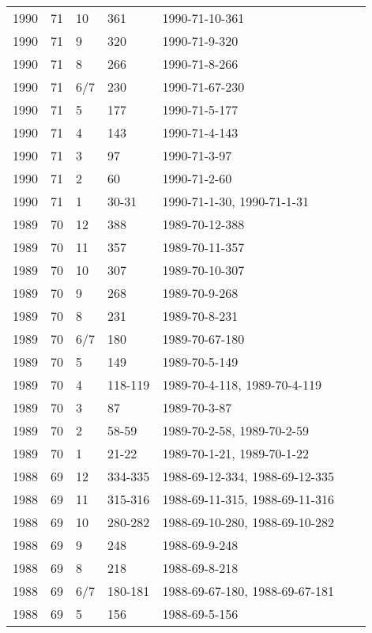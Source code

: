 \begin{longtable}{ |l|l|l|l|p{2.7cm}|l|p{2cm}| }
 1990 & 71 &    10 &    361  & 1990-71-10-361 &  & \\
 1990 & 71 &     9 &    320  & 1990-71-9-320  &  & \\
 1990 & 71 &     8 &    266  & 1990-71-8-266  &  & \\
 1990 & 71 &   6/7 &    230  & 1990-71-67-230 &  & \\
 1990 & 71 &     5 &    177  & 1990-71-5-177  &   & \\
 1990 & 71 &     4 &    143  & 1990-71-4-143  &  & \\
 1990 & 71 &     3 &   97    & 1990-71-3-97   &  & \\
 1990 & 71 &     2 &  60     & 1990-71-2-60   &  & \\
 1990 & 71 &     1 &  30-31  & 1990-71-1-30, 1990-71-1-31               &  & \\
 1989 & 70 &    12 &    388  & 1989-70-12-388 &   & \\
 1989 & 70 &    11 &    357  & 1989-70-11-357 &  & \\
 1989 & 70 &    10 &  307    & 1989-70-10-307 &  & \\
 1989 & 70 &     9 &    268  & 1989-70-9-268  &  & \\
 1989 & 70 &     8 &   231   &  1989-70-8-231 &  & \\
 1989 & 70 &   6/7 &   180   & 1989-70-67-180 &  & \\
 1989 & 70 &     5 & 149     & 1989-70-5-149  &  & \\
 1989 & 70 &     4 & 118-119 & 1989-70-4-118, 1989-70-4-119 &  & \\
 1989 & 70 &     3 &    87   & 1989-70-3-87   &  & \\
 1989 & 70 &     2 &  58-59  & 1989-70-2-58, 1989-70-2-59 &  & \\
 1989 & 70 &     1 & 21-22   & 1989-70-1-21, 1989-70-1-22 &  & \\
 1988 & 69 &    12 & 334-335 & 1988-69-12-334, 1988-69-12-335               &  & \\
 1988 & 69 &    11 & 315-316 & 1988-69-11-315, 1988-69-11-316 &  & \\
 1988 & 69 &    10 & 280-282 & 1988-69-10-280, 1988-69-10-282 &  & \\
 1988 & 69 &     9 &    248  & 1988-69-9-248  &  & \\
 1988 & 69 &     8 &    218  & 1988-69-8-218  &  & \\
 1988 & 69 &   6/7 & 180-181 & 1988-69-67-180, 1988-69-67-181 &  & \\
 1988 & 69 &     5 &    156  & 1988-69-5-156  &  & \\

\end{longtable}
